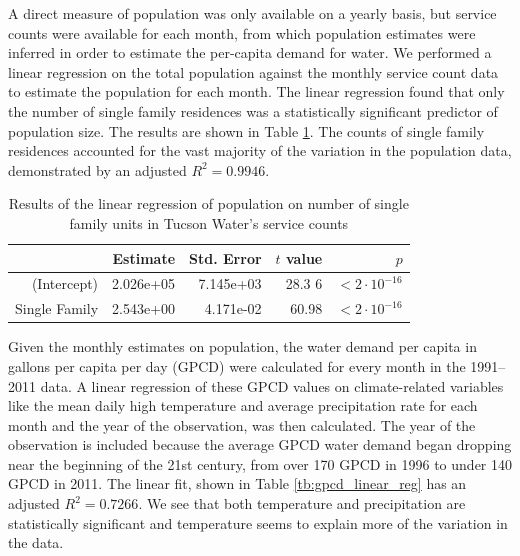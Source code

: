 \documentclass[11pt]{article}
\theoremstyle{plain}
\theoremstyle{definition}
\theoremstyle{remark}
\begin{document}
A direct measure of population was only available on a yearly basis, but service counts were available for each month, from which population estimates were inferred in order to estimate the per-capita demand for water.
We performed a linear regression on the total population against the monthly service count data to estimate the population for each month.
The linear regression found that only the number of single family residences was a statistically significant predictor of population size.
The results are shown in Table \ref{tb:population_linear_reg}.
The counts of single family residences accounted for the vast majority of the variation in the population data, demonstrated by an adjusted $R^2 = 0.9946$.

\begin{table}
	\centering
	\begin{tabular}{rrrrr}
		\hline
						   & Estimate  & Std. Error & $t$ value & $p$ \\
		\hline
		(Intercept)    & 2.026e+05 & 7.145e+03  & 28.3 6    & $<2 \cdot 10^{-16}$ \\
		Single Family  & 2.543e+00 & 4.171e-02  & 60.98     & $<2 \cdot 10^{-16}$ \\
		\hline
	\end{tabular}
	\caption{
		Results of the linear regression of population on number of single family units in Tucson Water's service counts
	}
	\label{tb:population_linear_reg}
\end{table}

Given the monthly estimates on population, the water demand per capita in gallons per capita per day (GPCD) were calculated for every month in the 1991--2011 data.
A linear regression of these GPCD values on climate-related variables like the mean daily high temperature and average precipitation rate for each month and the year of the observation, was then calculated.
The year of the observation is included because the average GPCD water demand began dropping near the beginning of the 21st century, from over 170 GPCD in 1996 to under 140 GPCD in 2011.
The linear fit, shown in Table \ref{tb:gpcd_linear_reg} has an adjusted $R^2 = 0.7266$.
We see that both temperature and precipitation are statistically significant and temperature seems to explain more of the variation in the data.
\end{document}
